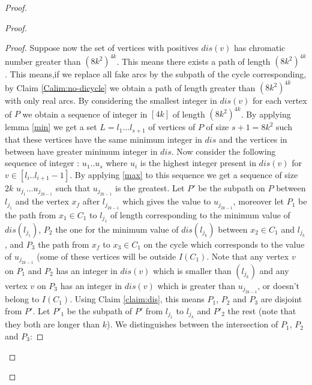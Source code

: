 \documentclass[utf8,10pt]{article}
\theoremstyle{plain}
\theoremstyle{definition}
\theoremstyle{remark}
\begin{document}
\begin{proof}
\begin{proof}
\begin{proof}
Suppose now the set of vertices with positives $dis(v)$ has chromatic number greater than $(8k^2)^{4k}$.
This means there exists a path of length $(8k^2)^{4k}$. This means,if we replace all fake arcs by the subpath of
the cycle corresponding, by Claim \ref{Calim:no-dicycle} we obtain a path of length greater than $(8k^2)^{4k}$ with only real arcs.
By considering the smallest integer in $dis(v)$ for each vertex of $P$ we obtain a sequence of integer in $[4k]$ of length $(8k^2)^{4k}$.
By applying lemma \ref{min} we get a set $L = l_1 \dots l_{s+1}$ of vertices of $P$ of size $s+1 = 8k^2$ such that these
vertices have the same minimum integer in $dis$ and the vertices in between have greater minimum integer in $dis$.
Now consider the following sequence of integer : $u_1 .. u_s$ where $u_i$ is the highest integer present in $dis(v)$
for $v \in [l_i .. l_{i+1} - 1]$.
By applying \ref{max} to this sequence we get a sequence of size $2k$ $u_{j_1} \dots u_{j_{2k-1}}$ such that $u_{j_{2k-1}}$ is the greatest.
Let $P'$ be the subpath on $P$ between $l_{j_1}$ and the vertex $x_f$ after $l_{j_{2k-1}}$ which gives the value to $u_{j_{2k-1}}$,
moreover let $P_1$  be the path from $x_1 \in C_1$ to $l_{j_1}$ of length corresponding to the minimum value of $dis(l_{j_1})$,
$P_2$ the one for the minimum value of $dis(l_{j_k})$ between $x_2 \in C_1$ and $l_{j_k}$, and $P_3$ the path
from $x_f$ to $x_3 \in C_1$ on the cycle which corresponds to the value of $u_{j_{2k-1}}$
(some of these vertices will be outside $I(C_1)$. Note that any vertex $v$ on $P_1$ and $P_2$ has an integer in $dis(v)$
which is smaller than $(l_{j_k})$ and any vertex $v$ on $P_3$ has an integer in $dis(v)$ which
is greater than $u_{j_{2k-1}}$, or doesn't belong to $I(C_1)$. Using Claim \ref{claim:dis}, this means
$P_1$, $P_2$ and $P_3$ are disjoint from $P'$. Let $P'_1$ be the subpath of $P'$ from $l_{j_1}$ to $l_{j_k}$ and  $P'_2$ the rest
(note that they both are longer than $k$).
We distinguishes between the intersection of $P_1$, $P_2$ and $P_3$:


\end{proof}
\end{proof}
\end{proof}
\end{document}
